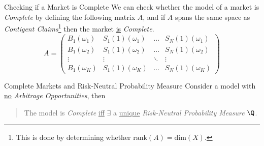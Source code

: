 \documentclass[11pt,a4paper]{article}
\begin{document}
  \begin{remark}{Checking if a Market is Complete}
    We can check whether the model of a market is \textit{Complete} by defining the following matrix $A$, and if $A$ spans the same space as \textit{Contigent Claims}\footnote{This is done by determining whether $\text{rank}(A)=\text{dim}(X)$.} then the market \underline{is} \textit{Complete}.
    \[ A=\begin{pmatrix}
        B_1(\omega_1)&S_1(1)(\omega_1)&\dots&S_N(1)(\omega_1)\\
        B_1(\omega_2)&S_1(1)(\omega_2)&\dots&S_N(1)(\omega_2)\\
        \vdots&\vdots&\ddots&\vdots\\
        B_1(\omega_K)&S_1(1)(\omega_K)&\dots&S_N(1)(\omega_K)
    \end{pmatrix} \]
  \end{remark}

  \begin{theorem}{Complete Markets and Risk-Neutral Probability Measure}\label{the_complete_markets_and_risk_neutral_probability_measure}
    Consider a model with \underline{no} \textit{Arbitrage Opportunities}, then
    \begin{quote}
      The model is \textit{Complete} \underline{iff} $\exists$ a \underline{unique} \textit{Risk-Neutral Probability Measure} $\Q$.
    \end{quote}
  \end{theorem}
\end{document}
